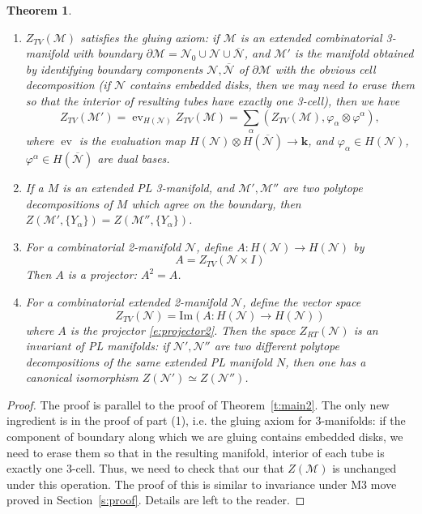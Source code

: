\documentclass{amsart}
\newtheorem{theorem}{Theorem}[section]
\theoremstyle{definition}
\theoremstyle{remark}
\numberwithin{equation}{section}
\newcommand{\thref}[1]{Theorem~{\rm\ref{#1}}}
\newcommand{\seref}[1]{Section~{\rm\ref{#1}}}
\newcommand{\ov}{\overline}
\newcommand{\del}{\partial}
\newcommand{\<}{\langle}
\renewcommand{\>}{\rangle}
\newcommand{\kk}{\mathbf{k}}       %
\newcommand{\N}{\mathcal{N}}       %
\newcommand{\M}{\mathcal{M}}      %
\newcommand{\al}{\alpha}
\newcommand{\ph}{\varphi}
\DeclareMathOperator{\ev}{ev} %
\begin{document}
\begin{theorem}\label{t:main4}
\par\noindent
  \begin{enumerate} 
      \item $Z_{TV}(\M)$ satisfies the gluing axiom: if $\M$ is an
        extended combinatorial 3-manifold with boundary $\del \M=\N_0\cup
        \N\cup\ov{\N}$, and $\M'$ is the manifold obtained by identifying
        boundary components $\N,\ov{\N}$ of $\del \M$ with the obvious cell
        decomposition \textup{(}if $\N$  contains embedded disks,
          then we may need to erase them so that the interior of 
            resulting tubes have  exactly  one 3-cell\textup{)}, then we
        have
    $$
      Z_{TV}(\M')=\ev_{H(\N)}Z_{TV}(\M)=\sum_\al (Z_{TV}(\M),
          \ph_\al\otimes \ph^\al),
    $$
        where $\ev$ is the evaluation map $H(\N)\otimes H(\ov{\N})\to
        \kk$, and $\ph_\al\in H(\N)$,  $\ph^\al\in H(\ov{\N})$ are dual
        bases.
 

      \item If a $M$ is an extended  PL 3-manifold, and $\M',
          \M''$ are two polytope
        decompositions of $M$  which agree     on the boundary, then
        $Z(\M',\{Y_\al\})=Z(\M'',\{Y_\al\})$. 
        
    \item For a combinatorial 2-manifold $\N$, define $A\colon H(\N)\to
      H(\N)$ by 
      \begin{equation}\label{e:projector2}
       A=Z_{TV}(\N\times I)
      \end{equation}
       Then $A$ is a projector: $A^2=A$.
      
      
    \item For a combinatorial extended  2-manifold $\N$, define the vector
        space
     \begin{equation}\label{e:modular_functor2}
    Z_{TV}(\N)=\mathrm{Im}(A\colon H (\N)\to H (\N))
    \end{equation}
  where $A$ is the projector \eqref{e:projector2}.
  Then the space $Z_{RT}(\N)$ is an invariant of PL manifolds: if $\N',
  \N''$ are two different polytope decompositions of the same extended PL
    manifold  $N$, then one has a canonical isomorphism $Z(\N')\simeq
  Z(\N'')$.
\end{enumerate}
\end{theorem}
\begin{proof}
 The proof is parallel to the proof of \thref{t:main2}. The only
 new ingredient is in the proof of part (1), i.e. the gluing axiom for
  3-manifolds: if the component of boundary along which we are gluing
    contains embedded disks, we need to erase them so that in the
  resulting manifold, interior of each tube is exactly one 3-cell. Thus,
  we need to check that our that $Z(\M)$ is unchanged under this
  operation. The proof of this is similar to invariance under M3 move
  proved in \seref{s:proof}. Details are left to the reader. 

\end{proof}
\end{document}
